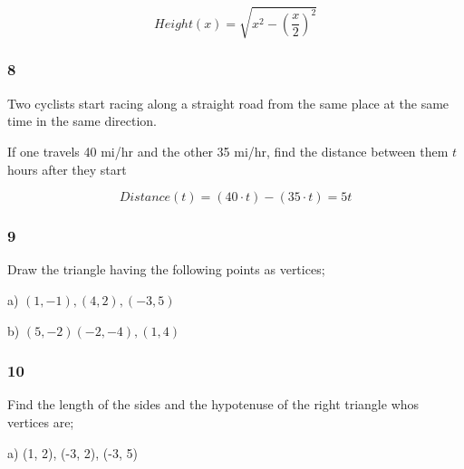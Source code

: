\documentclass[]{report}
\begin{document}
\[
Height(x) = \sqrt{x^2 - (\frac{x}{2})^2}
\]

\subsubsection{8}
Two cyclists start racing along a straight road from the same place at the same time in the same direction.

If one travels 40 mi/hr and the other 35 mi/hr, find the distance between them $t$ hours after they start

\[
Distance(t) = (40\cdot t) - (35\cdot t) = 5t
\]

\subsubsection{9}

Draw the triangle having the following points as vertices;

a) $(1, -1), (4, 2), (-3, 5)$


b) $(5, -2)(-2, -4), (1, 4)$



\subsubsection{10}

Find the length of the sides and the hypotenuse of the right triangle whos vertices are;

a) (1, 2), (-3, 2), (-3, 5)

\end{document}
